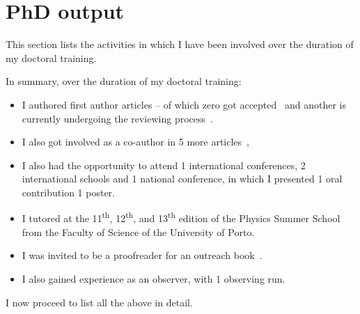 \chapter{PhD output}
\label{app:phd_output}

This section lists the activities in which I have been involved over the duration of my doctoral training. 

In summary, over the duration of my doctoral training:
\begin{itemize}
    \item I authored {} first author articles -- of which {\red zero} got accepted~\citet{ cite} and another is currently undergoing the reviewing process~\citep{cite}. 
    \item I also got involved as a co-author in 5 more articles~\citep{figueira_radial_2016, barros_precise_2017a, santerne_earthsized_2018, lillo-box_troy_2018, ulmer-moll_telluric_2018}, 
    \item I also had the opportunity to attend 1 international conferences, 2 international schools and 1 national conference, in which I presented 1 oral contribution 1 poster.
    \item I tutored at the 11\textsuperscript{th}, 12\textsuperscript{th}, and 13\textsuperscript{th} edition of the Physics Summer School from the Faculty of Science of the University of Porto.
    \item I was invited to be a proofreader for an outreach book~\citet{figueira_astro_2015}.
    \item I also gained experience as an observer, with 1 observing run.
\end{itemize}  

I now proceed to list all the above in detail.

\clearpage


\clearpage


\clearpage


\clearpage


\clearpage


\clearpage

